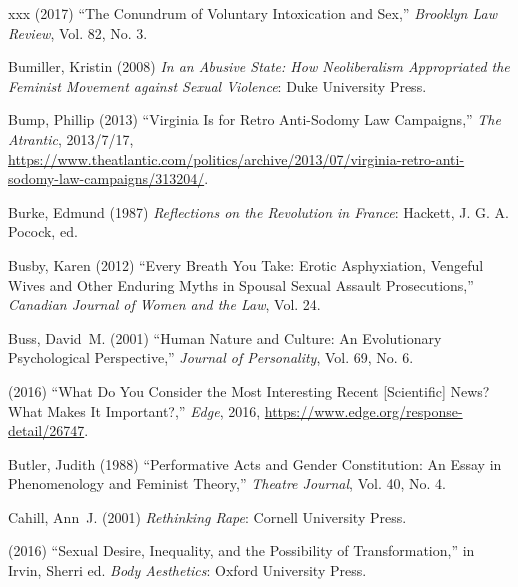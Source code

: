 \documentclass[]{jlreq} \usepackage{mystyle}
\begin{document}
\begin{thebibliography}{xxx}
 \bysame{}  (2017) ``The Conundrum of Voluntary Intoxication and Sex,''
  \textit{ Brooklyn Law Review}, Vol. 82, No. 3.

Bumiller, Kristin (2008)  \textit{ In an Abusive State: How Neoliberalism
  Appropriated the Feminist Movement against Sexual Violence}: Duke University
  Press.

Bump, Phillip (2013) ``Virginia Is for Retro Anti-Sodomy Law Campaigns,''
  \emph{The Atrantic}, 2013/7/17,
  \url{https://www.theatlantic.com/politics/archive/2013/07/virginia-retro-anti-sodomy-law-campaigns/313204/}.

Burke, Edmund (1987)  \textit{ Reflections on the Revolution in France}:
  Hackett, J. G. A. Pocock, ed.

Busby, Karen (2012) ``Every Breath You Take: Erotic Asphyxiation, Vengeful
  Wives and Other Enduring Myths in Spousal Sexual Assault Prosecutions,''
  \textit{ Canadian Journal of Women and the Law}, Vol. 24.

Buss, David~M. (2001) ``Human Nature and Culture: An Evolutionary Psychological
  Perspective,'' \textit{ Journal of Personality}, Vol. 69, No. 6.

 \bysame{}  (2016) ``What Do You Consider the Most Interesting Recent
  [Scientific] News? What Makes It Important?,'' \emph{Edge}, 2016,
  \url{https://www.edge.org/response-detail/26747}.

Butler, Judith (1988) ``Performative Acts and Gender Constitution: An Essay in
  Phenomenology and Feminist Theory,'' \textit{ Theatre Journal}, Vol. 40, No.
  4.

Cahill, Ann~J. (2001)  \textit{ Rethinking Rape}: Cornell University Press.

 \bysame{}  (2016) ``Sexual Desire, Inequality, and the Possibility of
  Transformation,'' in Irvin, Sherri ed.   \textit{ Body Aesthetics}: Oxford
  University Press.


\end{thebibliography}
\end{document}
